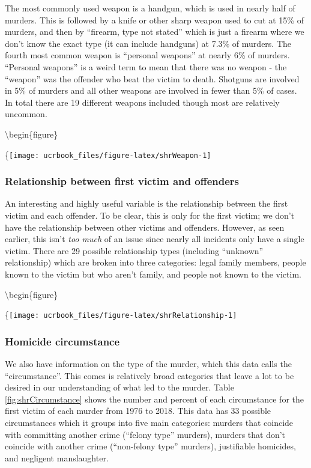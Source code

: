 \documentclass[
  12pt,
  openany]{book}
\begin{document}
The most commonly used weapon is a handgun, which is used in nearly half of murders. This is followed by a knife or other sharp weapon used to cut at 15\% of murders, and then by ``firearm, type not stated'' which is just a firearm where we don't know the exact type (it can include handguns) at 7.3\% of murders. The fourth most common weapon is ``personal weapons'' at nearly 6\% of murders. ``Personal weapons'' is a weird term to mean that there was no weapon - the ``weapon'' was the offender who beat the victim to death. Shotguns are involved in 5\% of murders and all other weapons are involved in fewer than 5\% of cases. In total there are 19 different weapons included though most are relatively uncommon.

\textbackslash begin\{figure\}

\{\centering \texttt{[image: ucrbook\_files/figure-latex/shrWeapon-1]}

\hypertarget{relationship-between-first-victim-and-offenders}{%
\subsubsection{Relationship between first victim and offenders}\label{relationship-between-first-victim-and-offenders}}

An interesting and highly useful variable is the relationship between the first victim and each offender. To be clear, this is only for the first victim; we don't have the relationship between other victims and offenders. However, as seen earlier, this isn't \emph{too much} of an issue since nearly all incidents only have a single victim. There are 29 possible relationship types (including ``unknown'' relationship) which are broken into three categories: legal family members, people known to the victim but who aren't family, and people not known to the victim.

\textbackslash begin\{figure\}

\{\centering \texttt{[image: ucrbook\_files/figure-latex/shrRelationship-1]}

\hypertarget{circumstance}{%
\subsubsection{Homicide circumstance}\label{circumstance}}

We also have information on the type of the murder, which this data calls the ``circumstance''. This comes is relatively broad categories that leave a lot to be desired in our understanding of what led to the murder. Table \ref{fig:shrCircumstance} shows the number and percent of each circumstance for the first victim of each murder from 1976 to 2018. This data has 33 possible circumstances which it groups into five main categories: murders that coincide with committing another crime (``felony type'' murders), murders that don't coincide with another crime (``non-felony type'' murders), justifiable homicides, and negligent manslaughter.
\end{document}
